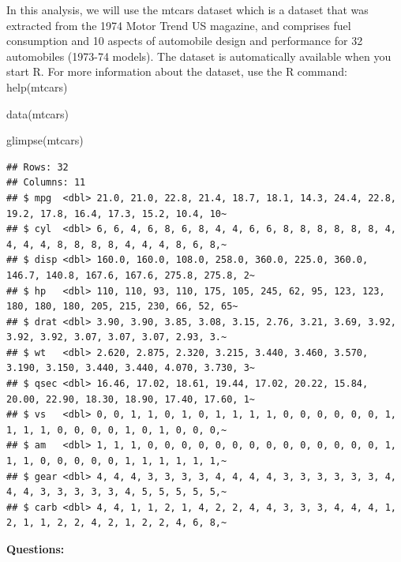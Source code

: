 \documentclass[
]{book}
\newenvironment{Shaded}{\begin{snugshade}}{\end{snugshade}}
\newcommand{\FunctionTok}[1]{\textcolor[rgb]{0.00,0.00,0.00}{#1}}
\newcommand{\NormalTok}[1]{#1}
\theoremstyle{definition}
\theoremstyle{definition}
\theoremstyle{definition}
\theoremstyle{definition}
\theoremstyle{remark}
\begin{document}
In this analysis, we will use the mtcars dataset which is a dataset that was extracted from the 1974 Motor Trend US magazine, and comprises fuel consumption and 10 aspects of automobile design and performance for 32 automobiles (1973-74 models). The dataset is automatically available when you start R. For more information about the dataset, use the R command: help(mtcars)

\begin{Shaded}
\begin{Highlighting}[]
\FunctionTok{data}\NormalTok{(mtcars)}

\FunctionTok{glimpse}\NormalTok{(mtcars)}
\end{Highlighting}
\end{Shaded}

\begin{verbatim}
## Rows: 32
## Columns: 11
## $ mpg  <dbl> 21.0, 21.0, 22.8, 21.4, 18.7, 18.1, 14.3, 24.4, 22.8, 19.2, 17.8, 16.4, 17.3, 15.2, 10.4, 10~
## $ cyl  <dbl> 6, 6, 4, 6, 8, 6, 8, 4, 4, 6, 6, 8, 8, 8, 8, 8, 8, 4, 4, 4, 4, 8, 8, 8, 8, 4, 4, 4, 8, 6, 8,~
## $ disp <dbl> 160.0, 160.0, 108.0, 258.0, 360.0, 225.0, 360.0, 146.7, 140.8, 167.6, 167.6, 275.8, 275.8, 2~
## $ hp   <dbl> 110, 110, 93, 110, 175, 105, 245, 62, 95, 123, 123, 180, 180, 180, 205, 215, 230, 66, 52, 65~
## $ drat <dbl> 3.90, 3.90, 3.85, 3.08, 3.15, 2.76, 3.21, 3.69, 3.92, 3.92, 3.92, 3.07, 3.07, 3.07, 2.93, 3.~
## $ wt   <dbl> 2.620, 2.875, 2.320, 3.215, 3.440, 3.460, 3.570, 3.190, 3.150, 3.440, 3.440, 4.070, 3.730, 3~
## $ qsec <dbl> 16.46, 17.02, 18.61, 19.44, 17.02, 20.22, 15.84, 20.00, 22.90, 18.30, 18.90, 17.40, 17.60, 1~
## $ vs   <dbl> 0, 0, 1, 1, 0, 1, 0, 1, 1, 1, 1, 0, 0, 0, 0, 0, 0, 1, 1, 1, 1, 0, 0, 0, 0, 1, 0, 1, 0, 0, 0,~
## $ am   <dbl> 1, 1, 1, 0, 0, 0, 0, 0, 0, 0, 0, 0, 0, 0, 0, 0, 0, 1, 1, 1, 0, 0, 0, 0, 0, 1, 1, 1, 1, 1, 1,~
## $ gear <dbl> 4, 4, 4, 3, 3, 3, 3, 4, 4, 4, 4, 3, 3, 3, 3, 3, 3, 4, 4, 4, 3, 3, 3, 3, 3, 4, 5, 5, 5, 5, 5,~
## $ carb <dbl> 4, 4, 1, 1, 2, 1, 4, 2, 2, 4, 4, 3, 3, 3, 4, 4, 4, 1, 2, 1, 1, 2, 2, 4, 2, 1, 2, 2, 4, 6, 8,~
\end{verbatim}

\textbf{Questions:}
\end{document}
